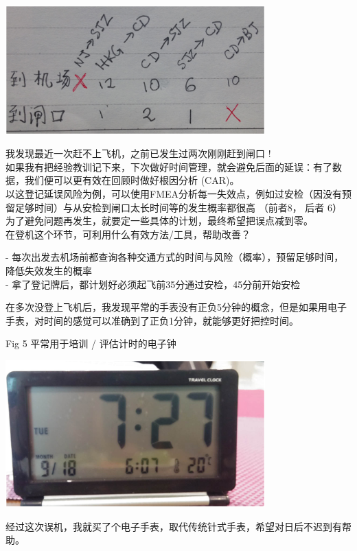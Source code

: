 
\includegraphics[width=10cm]{风险与机会4.png}

我发现最近一次赶不上飞机，之前已发生过两次刚刚赶到闸口 !\\
如果我有把经验教训记下来，下次做好时间管理，就会避免后面的延误：有了数据，我们便可以更有效在回顾时做好根因分析
(CAR)。\\
以这登记延误风险为例，可以使用FMEA分析每一失效点，例如过安检（因没有预留足够时间）与从安检到闸口太长时间等的发生概率都很高
（前者8， 后者 6）\\
为了避免问题再发生，就要定一些具体的计划，最终希望把误点减到零。\\
在登机这个环节，可利用什么有效方法/工具，帮助改善？

-
每次出发去机场前都查询各种交通方式的时间与风险（概率），预留足够时间，降低失效发生的概率\\
- 拿了登记牌后，都计划好必须起飞前35分通过安检，45分前开始安检

在多次没登上飞机后，我发现平常的手表没有正负5分钟的概念，但是如果用电子手表，对时间的感觉可以准确到了正负1分钟，就能够更好把控时间。

Fig 5 平常用于培训 / 评估计时的电子钟


\includegraphics[width=10cm]{风险与机会5_闹钟.png}

经过这次误机，我就买了个电子手表，取代传统针式手表，希望对日后不迟到有帮助。

